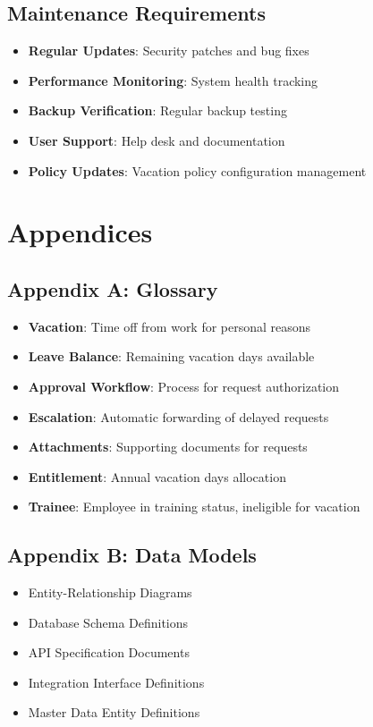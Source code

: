 \documentclass[12pt,a4paper]{article}
\begin{document}
\subsection{Maintenance Requirements}
\begin{itemize}
    \item \textbf{Regular Updates}: Security patches and bug fixes
    \item \textbf{Performance Monitoring}: System health tracking
    \item \textbf{Backup Verification}: Regular backup testing
    \item \textbf{User Support}: Help desk and documentation
    \item \textbf{Policy Updates}: Vacation policy configuration management
\end{itemize}

\section{Appendices}

\subsection{Appendix A: Glossary}
\begin{itemize}
    \item \textbf{Vacation}: Time off from work for personal reasons
    \item \textbf{Leave Balance}: Remaining vacation days available
    \item \textbf{Approval Workflow}: Process for request authorization
    \item \textbf{Escalation}: Automatic forwarding of delayed requests
    \item \textbf{Attachments}: Supporting documents for requests
    \item \textbf{Entitlement}: Annual vacation days allocation
    \item \textbf{Trainee}: Employee in training status, ineligible for vacation
\end{itemize}

\subsection{Appendix B: Data Models}
\begin{itemize}
    \item Entity-Relationship Diagrams
    \item Database Schema Definitions
    \item API Specification Documents
    \item Integration Interface Definitions
    \item Master Data Entity Definitions
\end{itemize}
\end{document}
